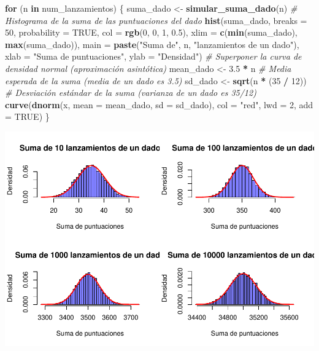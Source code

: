 \documentclass[
]{article}
\newenvironment{Shaded}{\begin{snugshade}}{\end{snugshade}}
\newcommand{\AttributeTok}[1]{\textcolor[rgb]{0.13,0.29,0.53}{#1}}
\newcommand{\CommentTok}[1]{\textcolor[rgb]{0.56,0.35,0.01}{\textit{#1}}}
\newcommand{\ConstantTok}[1]{\textcolor[rgb]{0.56,0.35,0.01}{#1}}
\newcommand{\ControlFlowTok}[1]{\textcolor[rgb]{0.13,0.29,0.53}{\textbf{#1}}}
\newcommand{\DecValTok}[1]{\textcolor[rgb]{0.00,0.00,0.81}{#1}}
\newcommand{\FloatTok}[1]{\textcolor[rgb]{0.00,0.00,0.81}{#1}}
\newcommand{\FunctionTok}[1]{\textcolor[rgb]{0.13,0.29,0.53}{\textbf{#1}}}
\newcommand{\NormalTok}[1]{#1}
\newcommand{\OtherTok}[1]{\textcolor[rgb]{0.56,0.35,0.01}{#1}}
\newcommand{\SpecialCharTok}[1]{\textcolor[rgb]{0.81,0.36,0.00}{\textbf{#1}}}
\newcommand{\StringTok}[1]{\textcolor[rgb]{0.31,0.60,0.02}{#1}}
\begin{document}
\begin{Shaded}
\begin{Highlighting}[]
\ControlFlowTok{for}\NormalTok{ (n }\ControlFlowTok{in}\NormalTok{ num\_lanzamientos) \{}
\NormalTok{  suma\_dado }\OtherTok{\textless{}{-}} \FunctionTok{simular\_suma\_dado}\NormalTok{(n)}
  \CommentTok{\# Histograma de la suma de las puntuaciones del dado}
  \FunctionTok{hist}\NormalTok{(suma\_dado, }\AttributeTok{breaks =} \DecValTok{50}\NormalTok{, }\AttributeTok{probability =} \ConstantTok{TRUE}\NormalTok{, }
       \AttributeTok{col =} \FunctionTok{rgb}\NormalTok{(}\DecValTok{0}\NormalTok{, }\DecValTok{0}\NormalTok{, }\DecValTok{1}\NormalTok{, }\FloatTok{0.5}\NormalTok{), }\AttributeTok{xlim =} \FunctionTok{c}\NormalTok{(}\FunctionTok{min}\NormalTok{(suma\_dado), }\FunctionTok{max}\NormalTok{(suma\_dado)), }
       \AttributeTok{main =} \FunctionTok{paste}\NormalTok{(}\StringTok{"Suma de"}\NormalTok{, n, }\StringTok{"lanzamientos de un dado"}\NormalTok{), }
       \AttributeTok{xlab =} \StringTok{"Suma de puntuaciones"}\NormalTok{, }\AttributeTok{ylab =} \StringTok{"Densidad"}\NormalTok{)}
  \CommentTok{\# Superponer la curva de densidad normal (aproximación asintótica)}
\NormalTok{  mean\_dado }\OtherTok{\textless{}{-}} \FloatTok{3.5} \SpecialCharTok{*}\NormalTok{ n  }\CommentTok{\# Media esperada de la suma (media de un dado es 3.5)}
\NormalTok{  sd\_dado }\OtherTok{\textless{}{-}} \FunctionTok{sqrt}\NormalTok{(n }\SpecialCharTok{*}\NormalTok{ (}\DecValTok{35} \SpecialCharTok{/} \DecValTok{12}\NormalTok{))  }\CommentTok{\# Desviación estándar de la suma (varianza de un dado es 35/12)}
  \FunctionTok{curve}\NormalTok{(}\FunctionTok{dnorm}\NormalTok{(x, }\AttributeTok{mean =}\NormalTok{ mean\_dado, }\AttributeTok{sd =}\NormalTok{ sd\_dado), }
        \AttributeTok{col =} \StringTok{"red"}\NormalTok{, }\AttributeTok{lwd =} \DecValTok{2}\NormalTok{, }\AttributeTok{add =} \ConstantTok{TRUE}\NormalTok{)}
\NormalTok{\}}
\end{Highlighting}
\end{Shaded}

\includegraphics{FundamentosInferenciaEstadistica_files/figure-latex/unnamed-chunk-15-1.pdf}
\end{document}
